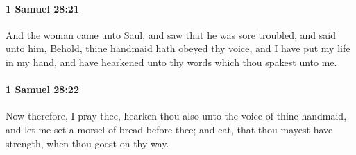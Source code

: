 		\paragraph{1 Samuel 28:21} %
			\label{1SAMUEL-28-21}

			And the woman came unto Saul, and saw that he was sore troubled, and said unto him, Behold, thine handmaid hath obeyed thy voice, and I have put my life in my hand, and have hearkened unto thy words which thou spakest unto me.


		\paragraph{1 Samuel 28:22} %
			\label{1SAMUEL-28-22}

			Now therefore, I pray thee, hearken thou also unto the voice of thine handmaid, and let me set a morsel of bread before thee; and eat, that thou mayest have strength, when thou goest on thy way.

